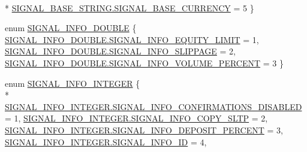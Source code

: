 \begin{DoxyCompactItemize}
\\*
\hyperlink{namespace_m_q_l4_c_sharp_1_1_base_1_1_enums_a8a930a0524996541c8f8cf767faa0370a83a3460c5a77fac85335d303f7a2fee5}{S\+I\+G\+N\+A\+L\+\_\+\+B\+A\+S\+E\+\_\+\+S\+T\+R\+I\+N\+G.\+S\+I\+G\+N\+A\+L\+\_\+\+B\+A\+S\+E\+\_\+\+C\+U\+R\+R\+E\+N\+CY} = 5
 \}
\item 
enum \hyperlink{namespace_m_q_l4_c_sharp_1_1_base_1_1_enums_a80b17d9a3dd57e02283914b41c3a9f60}{S\+I\+G\+N\+A\+L\+\_\+\+I\+N\+F\+O\+\_\+\+D\+O\+U\+B\+LE} \{ \hyperlink{namespace_m_q_l4_c_sharp_1_1_base_1_1_enums_a80b17d9a3dd57e02283914b41c3a9f60a95695157e284f5159183e14c23657440}{S\+I\+G\+N\+A\+L\+\_\+\+I\+N\+F\+O\+\_\+\+D\+O\+U\+B\+L\+E.\+S\+I\+G\+N\+A\+L\+\_\+\+I\+N\+F\+O\+\_\+\+E\+Q\+U\+I\+T\+Y\+\_\+\+L\+I\+M\+IT} = 1, 
\hyperlink{namespace_m_q_l4_c_sharp_1_1_base_1_1_enums_a80b17d9a3dd57e02283914b41c3a9f60a648a1443a8298a85de928d2e1bb3edb7}{S\+I\+G\+N\+A\+L\+\_\+\+I\+N\+F\+O\+\_\+\+D\+O\+U\+B\+L\+E.\+S\+I\+G\+N\+A\+L\+\_\+\+I\+N\+F\+O\+\_\+\+S\+L\+I\+P\+P\+A\+GE} = 2, 
\hyperlink{namespace_m_q_l4_c_sharp_1_1_base_1_1_enums_a80b17d9a3dd57e02283914b41c3a9f60af73dfbfaa24374995d99d6552e12cf47}{S\+I\+G\+N\+A\+L\+\_\+\+I\+N\+F\+O\+\_\+\+D\+O\+U\+B\+L\+E.\+S\+I\+G\+N\+A\+L\+\_\+\+I\+N\+F\+O\+\_\+\+V\+O\+L\+U\+M\+E\+\_\+\+P\+E\+R\+C\+E\+NT} = 3
 \}
\item 
enum \hyperlink{namespace_m_q_l4_c_sharp_1_1_base_1_1_enums_ab3373be5a69a03b44356baab2b3afc4d}{S\+I\+G\+N\+A\+L\+\_\+\+I\+N\+F\+O\+\_\+\+I\+N\+T\+E\+G\+ER} \{ \\*
\hyperlink{namespace_m_q_l4_c_sharp_1_1_base_1_1_enums_ab3373be5a69a03b44356baab2b3afc4dab3a6a6a1553f08ec4410385c06bc149b}{S\+I\+G\+N\+A\+L\+\_\+\+I\+N\+F\+O\+\_\+\+I\+N\+T\+E\+G\+E\+R.\+S\+I\+G\+N\+A\+L\+\_\+\+I\+N\+F\+O\+\_\+\+C\+O\+N\+F\+I\+R\+M\+A\+T\+I\+O\+N\+S\+\_\+\+D\+I\+S\+A\+B\+L\+ED} = 1, 
\hyperlink{namespace_m_q_l4_c_sharp_1_1_base_1_1_enums_ab3373be5a69a03b44356baab2b3afc4dad7f50e1e6e0ce8b6fd1e4622284dad85}{S\+I\+G\+N\+A\+L\+\_\+\+I\+N\+F\+O\+\_\+\+I\+N\+T\+E\+G\+E\+R.\+S\+I\+G\+N\+A\+L\+\_\+\+I\+N\+F\+O\+\_\+\+C\+O\+P\+Y\+\_\+\+S\+L\+TP} = 2, 
\hyperlink{namespace_m_q_l4_c_sharp_1_1_base_1_1_enums_ab3373be5a69a03b44356baab2b3afc4da70d455fc27e4a397288f3521fae76cb7}{S\+I\+G\+N\+A\+L\+\_\+\+I\+N\+F\+O\+\_\+\+I\+N\+T\+E\+G\+E\+R.\+S\+I\+G\+N\+A\+L\+\_\+\+I\+N\+F\+O\+\_\+\+D\+E\+P\+O\+S\+I\+T\+\_\+\+P\+E\+R\+C\+E\+NT} = 3, 
\hyperlink{namespace_m_q_l4_c_sharp_1_1_base_1_1_enums_ab3373be5a69a03b44356baab2b3afc4dacb9c606a2eac042a84226eafa2331796}{S\+I\+G\+N\+A\+L\+\_\+\+I\+N\+F\+O\+\_\+\+I\+N\+T\+E\+G\+E\+R.\+S\+I\+G\+N\+A\+L\+\_\+\+I\+N\+F\+O\+\_\+\+ID} = 4, 

\end{DoxyCompactItemize}
